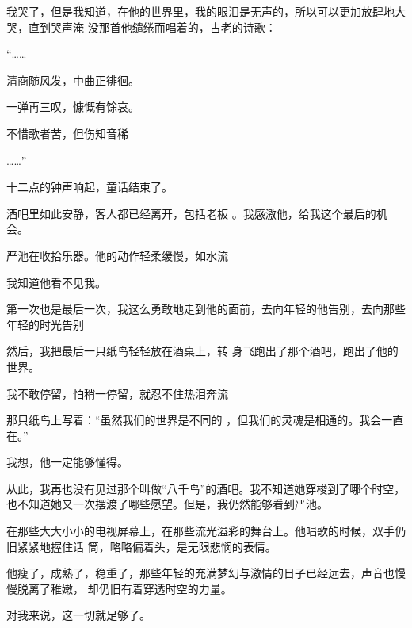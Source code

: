\documentclass{article}
\begin{document}
我哭了，但是我知道，在他的世界里，我的眼泪是无声的，所以可以更加放肆地大哭，直到哭声淹
没那首他缱绻而唱着的，古老的诗歌： 


“…… 


清商随风发，中曲正徘徊。 


一弹再三叹，慷慨有馀哀。 


不惜歌者苦，但伤知音稀 


\newpage

……”　　　　　　　　　　　　　 


十二点的钟声响起，童话结束了。 

酒吧里如此安静，客人都已经离开，包括老板
。我感激他，给我这个最后的机会。 

严池在收拾乐器。他的动作轻柔缓慢，如水流


我知道他看不见我。 

第一次也是最后一次，我这么勇敢地走到他的面前，去向年轻的他告别，去向那些年轻的时光告别

然后，我把最后一只纸鸟轻轻放在酒桌上，转
身飞跑出了那个酒吧，跑出了他的世界。 

我不敢停留，怕稍一停留，就忍不住热泪奔流

那只纸鸟上写着：“虽然我们的世界是不同的
，但我们的灵魂是相通的。我会一直在。” 

\newpage

我想，他一定能够懂得。　　　　　　　　　
　　　　　 

从此，我再也没有见过那个叫做“八千鸟”的酒吧。我不知道她穿梭到了哪个时空，也不知道她又一次摆渡了哪些愿望。但是，我仍然能够看到严池。

在那些大大小小的电视屏幕上，在那些流光溢彩的舞台上。他唱歌的时候，双手仍旧紧紧地握住话
筒，略略偏着头，是无限悲悯的表情。 

他瘦了，成熟了，稳重了，那些年轻的充满梦幻与激情的日子已经远去，声音也慢慢脱离了稚嫩，
却仍旧有着穿透时空的力量。 

对我来说，这一切就足够了。
\end{document}
